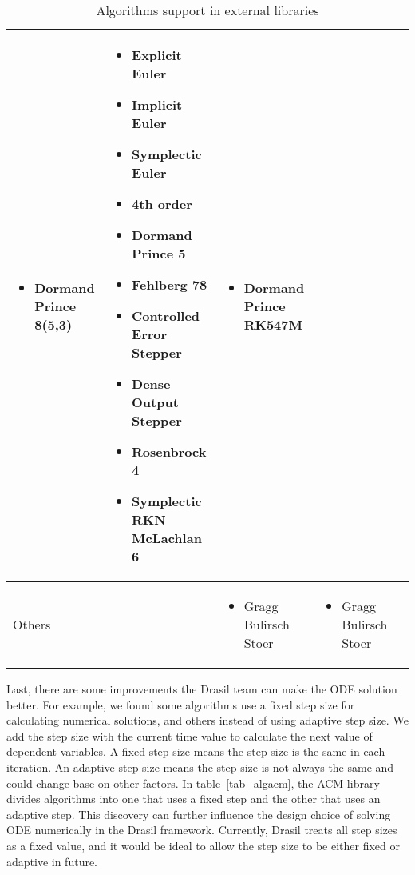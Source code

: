 \begin{sidewaystable}
\begin{adjustbox}{width=\columnwidth,center}
\begin{tabular}{p{} | p{} p{} p{} p{}}
\begin{itemize}[wide]
        \item Dormand Prince 8(5,3) 
        \end{itemize} & 
        \begin{itemize}[wide]
        \item Explicit Euler
        \item Implicit Euler
        \item Symplectic Euler
        \item 4th order
        \item Dormand Prince 5
        \item Fehlberg 78
        \item Controlled Error Stepper
        \item Dense Output Stepper
        \item Rosenbrock 4
        \item Symplectic RKN McLachlan 6
        \end{itemize} & 
        \begin{itemize}[wide]
        \item Dormand Prince RK547M
        \end{itemize} \\ \hline
    Others && 
        \begin{itemize}[wide]
        \item Gragg Bulirsch Stoer 
        \end{itemize} & 
        \begin{itemize}[wide]
        \item Gragg Bulirsch Stoer 
        \end{itemize} &\\
    \bottomrule	
\end{tabular}
\end{adjustbox}
\caption{Algorithms support in external libraries}	
\label{tab_algoexlib}
\end{sidewaystable}

Last, there are some improvements the Drasil team can make the ODE solution better. For example, we found some algorithms use a fixed step size for calculating numerical solutions, and others instead of using adaptive step size. We add the step size with the current time value to calculate the next value of dependent variables. A fixed step size means the step size is the same in each iteration. An adaptive step size means the step size is not always the same and could change base on other factors. In table~\ref{tab_algacm}, the ACM library divides algorithms into one that uses a fixed step and the other that uses an adaptive step. This discovery can further influence the design choice of solving ODE numerically in the Drasil framework. Currently, Drasil treats all step sizes as a fixed value, and it would be ideal to allow the step size to be either fixed or adaptive in future.

